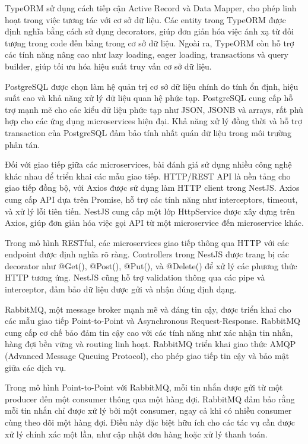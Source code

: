 TypeORM sử dụng cách tiếp cận Active Record và Data Mapper, cho phép linh hoạt trong việc tương tác với cơ sở dữ liệu. Các entity trong TypeORM được định nghĩa bằng cách sử dụng decorators, giúp đơn giản hóa việc ánh xạ từ đối tượng trong code đến bảng trong cơ sở dữ liệu. Ngoài ra, TypeORM còn hỗ trợ các tính năng nâng cao như lazy loading, eager loading, transactions và query builder, giúp tối ưu hóa hiệu suất truy vấn cơ sở dữ liệu.

PostgreSQL được chọn làm hệ quản trị cơ sở dữ liệu chính do tính ổn định, hiệu suất cao và khả năng xử lý dữ liệu quan hệ phức tạp. PostgreSQL cung cấp hỗ trợ mạnh mẽ cho các kiểu dữ liệu phức tạp như JSON, JSONB và arrays, rất phù hợp cho các ứng dụng microservices hiện đại. Khả năng xử lý đồng thời và hỗ trợ transaction của PostgreSQL đảm bảo tính nhất quán dữ liệu trong môi trường phân tán.

Đối với giao tiếp giữa các microservices, bài đánh giá sử dụng nhiều công nghệ khác nhau để triển khai các mẫu giao tiếp. HTTP/REST API là nền tảng cho giao tiếp đồng bộ, với Axios được sử dụng làm HTTP client trong NestJS. Axios cung cấp API dựa trên Promise, hỗ trợ các tính năng như interceptors, timeout, và xử lý lỗi tiên tiến. NestJS cung cấp một lớp HttpService được xây dựng trên Axios, giúp đơn giản hóa việc gọi API từ một microservice đến microservice khác.

Trong mô hình RESTful, các microservices giao tiếp thông qua HTTP với các endpoint được định nghĩa rõ ràng. Controllers trong NestJS được trang bị các decorator như @Get(), @Post(), @Put(), và @Delete() để xử lý các phương thức HTTP tương ứng. NestJS cũng hỗ trợ validation thông qua các pipe và interceptor, đảm bảo dữ liệu được gửi và nhận đúng định dạng.

RabbitMQ, một message broker mạnh mẽ và đáng tin cậy, được triển khai cho các mẫu giao tiếp Point-to-Point và Asynchronous Request-Response. RabbitMQ cung cấp cơ chế bảo đảm tin cậy cao với các tính năng như xác nhận tin nhắn, hàng đợi bền vững và routing linh hoạt. RabbitMQ triển khai giao thức AMQP (Advanced Message Queuing Protocol), cho phép giao tiếp tin cậy và bảo mật giữa các dịch vụ.

Trong mô hình Point-to-Point với RabbitMQ, mỗi tin nhắn được gửi từ một producer đến một consumer thông qua một hàng đợi. RabbitMQ đảm bảo rằng mỗi tin nhắn chỉ được xử lý bởi một consumer, ngay cả khi có nhiều consumer cùng theo dõi một hàng đợi. Điều này đặc biệt hữu ích cho các tác vụ cần được xử lý chính xác một lần, như cập nhật đơn hàng hoặc xử lý thanh toán.

